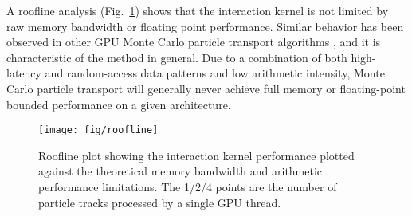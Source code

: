 \documentclass{webofc}
\begin{document}
A roofline analysis (Fig.~\ref{fig:roofline}) shows that the interaction kernel
is not limited by raw memory bandwidth or floating point performance.  Similar behavior has been observed in other GPU Monte Carlo particle transport algorithms \cite{hamilton_continuous-energy_2019}, and it is characteristic of the method in general.  Due to a combination of both high-latency and random-access data patterns and low arithmetic intensity, Monte Carlo particle transport will generally never achieve full memory or floating-point bounded performance on a given architecture.

\begin{figure}[htb]
  \centering
  \texttt{[image: fig/roofline]}
  \caption{Roofline plot showing the interaction kernel performance
    plotted against the theoretical memory bandwidth and arithmetic performance
    limitations. The 1/2/4 points are the number of particle tracks processed by
    a single GPU thread.}
  \label{fig:roofline}
\end{figure}

\end{document}
